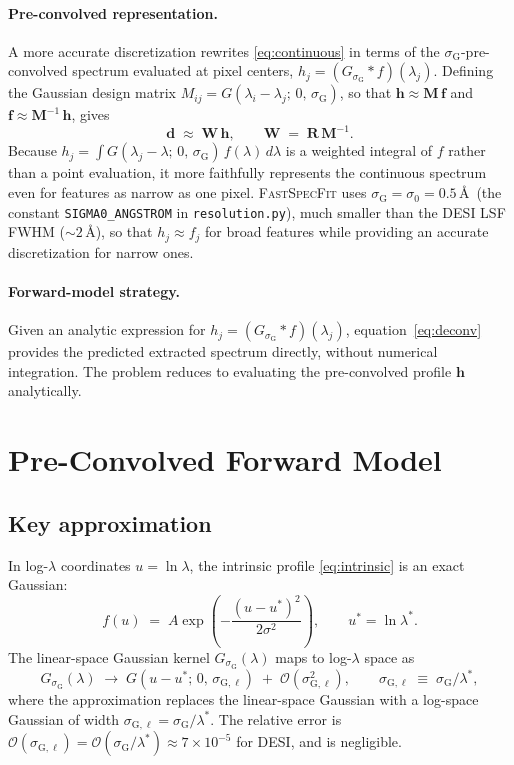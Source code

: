 \documentclass[12pt]{article}
\newcommand{\lstar}{\lambda^{*}}
\newcommand{\sG}{\sigma_{\mathrm{G}}}
\newcommand{\sGl}{\sigma_{\mathrm{G},\ell}}   %
\newcommand{\R}{\mathbf{R}}
\newcommand{\W}{\mathbf{W}}
\newcommand{\M}{\mathbf{M}}
\newcommand{\inv}[1]{#1^{-1}}
\begin{document}
\paragraph{Pre-convolved representation.}
A more accurate discretization rewrites \eqref{eq:continuous} in terms of
the $\sG$-pre-convolved spectrum evaluated at pixel centers,
$h_j = (G_{\sG}*f)(\lambda_j)$.  Defining the Gaussian design matrix
$M_{ij} = G(\lambda_i - \lambda_j;\,0,\,\sG)$, so that
$\mathbf{h} \approx \M\,\mathbf{f}$ and $\mathbf{f} \approx \inv{\M}\,\mathbf{h}$,
gives
\begin{equation}
  \mathbf{d} \;\approx\; \W\,\mathbf{h},
  \qquad
  \W \;=\; \R\,\inv{\M}.
  \label{eq:deconv}
\end{equation}
Because $h_j = \int G(\lambda_j - \lambda;\,0,\,\sG)\,f(\lambda)\,d\lambda$
is a weighted integral of $f$ rather than a point evaluation, it more
faithfully represents the continuous spectrum even for features as narrow as
one pixel.  \textsc{FastSpecFit} uses $\sG = \sigma_0 = 0.5$\,\AA\ (the
constant \texttt{SIGMA0\_ANGSTROM} in \texttt{resolution.py}), much smaller
than the DESI LSF FWHM (${\sim}2$\,\AA), so that $h_j \approx f_j$ for
broad features while providing an accurate discretization for narrow ones.

\paragraph{Forward-model strategy.}
Given an analytic expression for $h_j = (G_{\sG}*f)(\lambda_j)$,
equation~\eqref{eq:deconv} provides the predicted extracted spectrum
directly, without numerical integration.  The problem reduces to evaluating
the pre-convolved profile $\mathbf{h}$ analytically.


\section{Pre-Convolved Forward Model}
\label{sec:model}

\subsection{Key approximation}
\label{ssec:approx}

In log-$\lambda$ coordinates $u = \ln\lambda$, the intrinsic profile
\eqref{eq:intrinsic} is an exact Gaussian:
\begin{equation}
  f(u) \;=\; A\exp\!\left(-\frac{(u - u^*)^2}{2\sigma^2}\right),
  \qquad u^* = \ln\lstar.
\end{equation}
The linear-space Gaussian kernel $G_{\sG}(\lambda)$ maps to log-$\lambda$
space as
\begin{equation}
  G_{\sG}(\lambda) \;\longrightarrow\;
  G\!\left(u - u^*;\, 0,\, \sGl\right)
  \;+\; \mathcal{O}\!\left(\sGl^2\right),
  \qquad
  \sGl \;\equiv\; \sG/\lstar,
  \label{eq:kernel_approx}
\end{equation}
where the approximation replaces the linear-space Gaussian with a
log-space Gaussian of width $\sGl = \sG/\lstar$.  The relative error is
$\mathcal{O}(\sGl) = \mathcal{O}(\sG/\lstar) \approx 7\times10^{-5}$ for
DESI, and is negligible.
\end{document}
